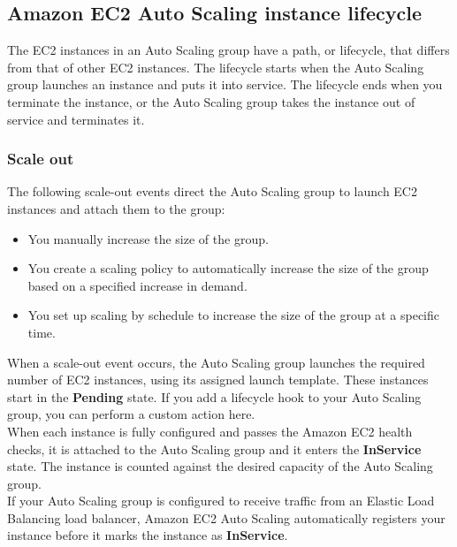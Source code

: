 \documentclass[12pt, letterpaper, twoside]{article}
\begin{document}
\subsection{Amazon EC2 Auto Scaling instance lifecycle}
The EC2 instances in an Auto Scaling group have a path, or lifecycle, that differs from that of other EC2 instances. 
The lifecycle starts when the Auto Scaling group launches an instance and puts it into service. The lifecycle ends 
when you terminate the instance, or the Auto Scaling group takes the instance out of service and terminates it.\\

\subsubsection{Scale out}
The following scale-out events direct the Auto Scaling group to launch EC2 instances and attach them to the group:
\begin{itemize}
	\item You manually increase the size of the group.
	\item You create a scaling policy to automatically increase the size of the group based on a specified increase 
		in demand.
	\item You set up scaling by schedule to increase the size of the group at a specific time. 
\end{itemize}

When a scale-out event occurs, the Auto Scaling group launches the required number of EC2 instances, using its 
assigned launch template. These instances start in the \textbf{Pending} state. If you add a lifecycle hook to your 
Auto Scaling group, you can perform a custom action here.\\

When each instance is fully configured and passes the Amazon EC2 health checks, it is attached to the Auto Scaling 
group and it enters the	\textbf{InService} state. The instance is counted against the desired capacity of the Auto 
Scaling group.\\

If your Auto Scaling group is configured to receive traffic from an Elastic Load Balancing load balancer, Amazon EC2 
Auto Scaling automatically registers your instance before it marks the instance as \textbf{InService}.\\
\end{document}
